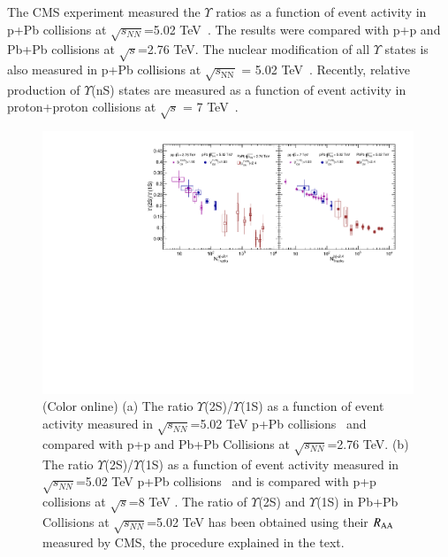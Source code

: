 The CMS experiment measured the $\Upsilon$ ratios as a function of event activity  
in p+Pb collisions at $\sqrt{s_{NN}}$=5.02 TeV~\cite{CMS:2013jsu}.
The results were compared with p+p and Pb+Pb collisions at $\sqrt{s}$=2.76 TeV.
 The nuclear modification of all $\Upsilon$ states is also measured in p+Pb collisions
 at $\sqrt{s_\mathrm{NN}}$ = 5.02 TeV~\cite{CMS:2022wfi}.
 Recently, relative production of $\Upsilon$(nS) states are measured as a function of
 event activity in proton+proton collisions at $ \sqrt{s} $ = 7 TeV~\cite{CMS:2020fae}.

\begin{figure}
  \begin{center}
\includegraphics[width=0.99\textwidth]{Figures/Fig12_LHC_Y2SByY1S_NTrk.pdf}
\caption{(Color online)
  (a) The ratio $\Upsilon$(2S)/$\Upsilon$(1S) as a function of event activity measured in 
$\sqrt{s_{NN}}$=5.02 TeV p+Pb collisions~\cite{CMS:2013jsu} and compared with p+p
and Pb+Pb Collisions at $\sqrt{s_{NN}}$=2.76 TeV.
(b) The ratio $\Upsilon$(2S)/$\Upsilon$(1S) as a function of event activity measured in 
$\sqrt{s_{NN}}$=5.02 TeV p+Pb collisions~\cite{CMS:2013jsu} and is compared with p+p
collisions at $\sqrt{s}$=8 TeV \cite{CMS:2020fae}.
The ratio of $\Upsilon$(2S) and $\Upsilon$(1S) in Pb+Pb Collisions at
$\sqrt{s_{NN}}$=5.02 TeV has been obtained using their $R_{\rm AA}$ measured by CMS, 
the procedure explained in the text.
}
\label{fig:UpsilonpPb}
\end{center}
\end{figure}





